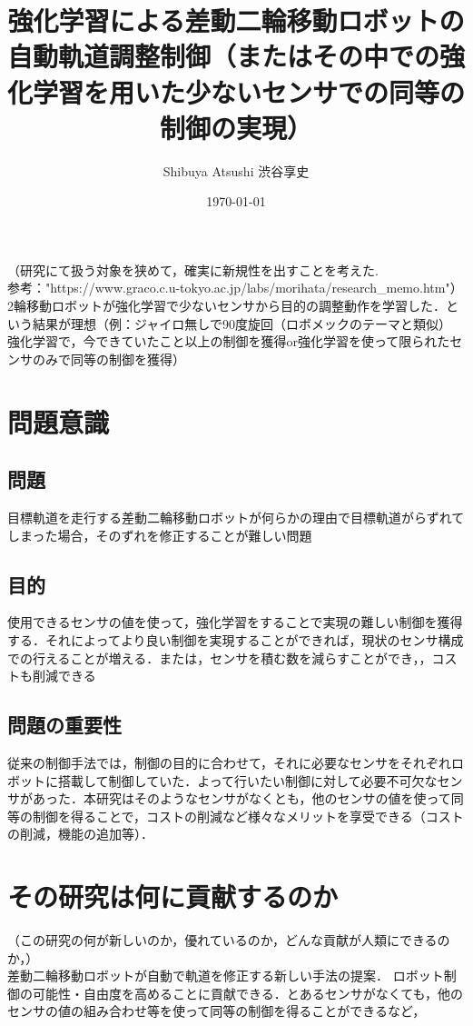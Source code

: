 \documentclass[a4paper,11pt]{jsarticle}
\begin{document}
\title{強化学習による差動二輪移動ロボットの自動軌道調整制御（またはその中での強化学習を用いた少ないセンサでの同等の制御の実現）}
\author{Shibuya Atsushi 渋谷享史}
\date{\today}
\maketitle

（研究にて扱う対象を狭めて，確実に新規性を出すことを考えた.\\
参考："https://www.graco.c.u-tokyo.ac.jp/labs/morihata/research\_memo.htm"）
2輪移動ロボットが強化学習で少ないセンサから目的の調整動作を学習した．という結果が理想（例：ジャイロ無しで90度旋回（ロボメックのテーマと類似）
\\強化学習で，今できていたこと以上の制御を獲得or強化学習を使って限られたセンサのみで同等の制御を獲得）

\section{問題意識}
\subsection{問題}
目標軌道を走行する差動二輪移動ロボットが何らかの理由で目標軌道がらずれてしまった場合，そのずれを修正することが難しい問題
\subsection{目的}
使用できるセンサの値を使って，強化学習をすることで実現の難しい制御を獲得する．それによってより良い制御を実現することができれば，現状のセンサ構成での行えることが増える．または，センサを積む数を減らすことができ，，コストも削減できる
\subsection{問題の重要性}
従来の制御手法では，制御の目的に合わせて，それに必要なセンサをそれぞれロボットに搭載して制御していた．よって行いたい制御に対して必要不可欠なセンサがあった．本研究はそのようなセンサがなくとも，他のセンサの値を使って同等の制御を得ることで，コストの削減など様々なメリットを享受できる（コストの削減，機能の追加等）．
\section{その研究は何に貢献するのか}
（この研究の何が新しいのか，優れているのか，どんな貢献が人類にできるのか，）\\
差動二輪移動ロボットが自動で軌道を修正する新しい手法の提案．
ロボット制御の可能性・自由度を高めることに貢献できる．とあるセンサがなくても，他のセンサの値の組み合わせ等を使って同等の制御を得ることができるなど，
\end{document}
